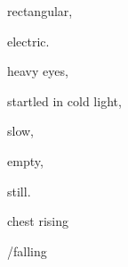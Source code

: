 \documentclass[extrafontsizes, 48pt]{memoir}
\newcommand\blankpage{%
    \null
    \thispagestyle{empty}%
    \addtocounter{page}{-1}%
    \newpage}
\begin{document}
	\begin{minipage}{.6\textwidth}
	rectangular,
	\end{minipage}
	\newpage

	\begin{minipage}{.6\textwidth}
	electric.
	\afterpage{\blankpage}
	\end{minipage}
	\newpage

	\begin{minipage}{.6\textwidth}
	heavy eyes,
	\end{minipage}
	\newpage

	\begin{minipage}{.6\textwidth}
	startled in cold light,
	\end{minipage}
	\newpage

	\begin{minipage}{.6\textwidth}
	slow,
	\end{minipage}
	\newpage

	\begin{minipage}{.6\textwidth}
	empty,
	\end{minipage}
	\newpage

	\begin{minipage}{.6\textwidth}
	still.
	\afterpage{\blankpage}
	\end{minipage}
	\newpage

	\begin{minipage}{.6\textwidth}
	chest rising
	\end{minipage}
	\newpage

	\begin{minipage}{.6\textwidth}
	/falling
	\afterpage{\blankpage}
	\end{minipage}
	\newpage
\end{document}
